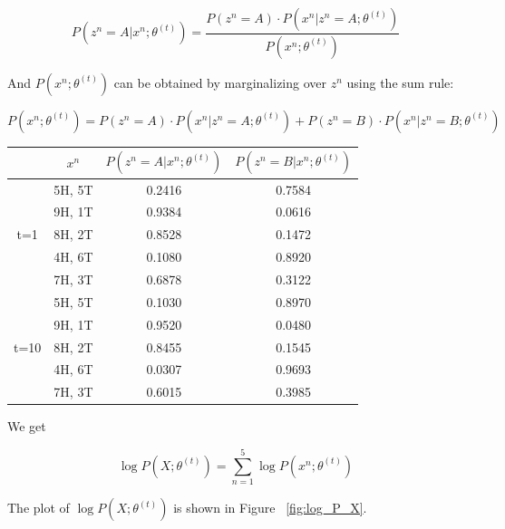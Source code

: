 \documentclass[a4paper]{article}
\begin{document}
\begin{equation}
	P(z^n = A|x^n; \theta^{(t)}) = \frac{P(z^n = A) \cdot P(x^n|z^n = A; \theta^{(t)})}{P(x^n; \theta^{(t)})}
\end{equation}

And $P(x^n; \theta^{(t)})$ can be obtained by marginalizing over $z^n$ using the sum rule: 

\begin{equation}
	P(x^n; \theta^{(t)}) = P(z^n = A) \cdot P(x^n|z^n = A; \theta^{(t)}) + P(z^n = B) \cdot P(x^n|z^n = B; \theta^{(t)})
\end{equation}

\begin{center}
\begin{tabular}{ | c | c | c | c | }
	\hline
	& $x^n$ & $P(z^n=A|x^n; \theta^{(t)})$ & $P(z^n=B|x^n; \theta^{(t)})$ \\ \hline
	\multirow{5}{*}{t=1} & 5H, 5T & 0.2416 & 0.7584 \\
		& 9H, 1T & 0.9384 & 0.0616 \\
		& 8H, 2T & 0.8528 & 0.1472 \\
		& 4H, 6T & 0.1080 & 0.8920 \\
		& 7H, 3T & 0.6878 & 0.3122 \\ \hline
    \multirow{5}{*}{t=10} & 5H, 5T & 0.1030 & 0.8970 \\
    	& 9H, 1T & 0.9520 & 0.0480 \\
    	& 8H, 2T & 0.8455 & 0.1545 \\
    	& 4H, 6T & 0.0307 & 0.9693 \\
    	& 7H, 3T & 0.6015 & 0.3985 \\ \hline
\end{tabular}
\end{center}

We get 

\begin{equation}
	\log P(X; \theta^{(t)}) = \sum_{n=1}^5 \log P(x^n; \theta^{(t)})
\end{equation}

The plot of $\log P(X; \theta^{(t)})$ is shown in Figure ~\ref{fig:log_P_X}.
\end{document}
